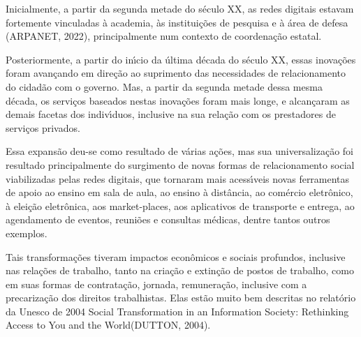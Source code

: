 \documentclass[
12pt,		%
openright,	%
twoside,  %
a4paper,			%
chapter=TITLE,		%
english,			%
french,				%
spanish,			%
brazil				%
]{USPSC-classe/USPSC}
\begin{document}
Inicialmente, a partir da segunda metade do s\'eculo XX, as redes digitais estavam fortemente vinculadas \`a academia, \`as institui\c{c}\~oes de pesquisa e \`a \'area de defesa  (ARPANET, 2022), principalmente num contexto de coordena\c{c}\~ao estatal.









Posteriormente, a partir do in\'{\i}cio da \'ultima d\'ecada do s\'eculo XX, essas inova\c{c}\~oes  foram avan\c{c}ando em dire\c{c}\~ao ao suprimento das necessidades de relacionamento do cidad\~ao com o governo. Mas, a partir da segunda metade dessa mesma d\'ecada, os servi\c{c}os baseados nestas inova\c{c}\~oes foram mais longe, e alcan\c{c}aram  as demais facetas dos indiv\'{\i}duos, inclusive na sua rela\c{c}\~ao com os prestadores de servi\c{c}os privados.









Essa expans\~ao deu-se como resultado de v\'arias a\c{c}\~oes, mas sua universaliza\c{c}\~ao foi resultado principalmente do surgimento de novas formas de relacionamento social viabilizadas pelas redes digitais, que tornaram mais acess\'{\i}veis novas ferramentas de apoio ao ensino em sala de aula, ao ensino \`a dist\^ancia, ao com\'ercio eletr\^onico, \`a elei\c{c}\~ao eletr\^onica, aos \textquotedbl market-places\textquotedbl , aos aplicativos de transporte e entrega, ao agendamento de eventos, reuni\~oes e consultas m\'edicas, dentre tantos outros exemplos.









Tais transforma\c{c}\~oes tiveram impactos econ\^omicos e sociais profundos, inclusive nas rela\c{c}\~oes de trabalho, tanto na cria\c{c}\~ao e extin\c{c}\~ao de postos de trabalho, como em suas formas de contrata\c{c}\~ao, jornada, remunera\c{c}\~ao, inclusive com a precariza\c{c}\~ao dos direitos trabalhistas. Elas est\~ao muito bem descritas  no relat\'orio da Unesco  de 2004 \textquotedbl Social Transformation in an Information Society: Rethinking Access to You and the World\textquotedbl  (DUTTON, 2004).
\end{document}
